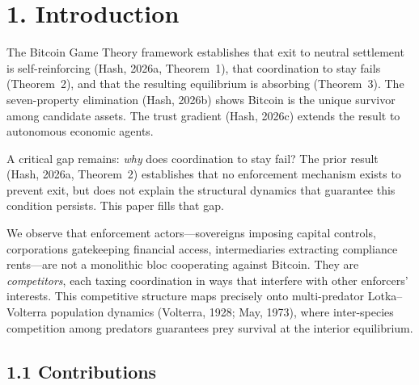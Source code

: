 \documentclass[12pt]{article}
\theoremstyle{definition}
\theoremstyle{remark}
\begin{document}
\newpage

\section{1. Introduction}\label{sec:intro}

The Bitcoin Game Theory framework establishes that exit to neutral
settlement is self-reinforcing (Hash, 2026a, Theorem~1), that
coordination to stay fails (Theorem~2), and that the resulting
equilibrium is absorbing (Theorem~3). The seven-property elimination
(Hash, 2026b) shows Bitcoin is the unique survivor among candidate
assets. The trust gradient (Hash, 2026c) extends the result to
autonomous economic agents.

A critical gap remains: \emph{why} does coordination to stay fail?  The
prior result (Hash, 2026a, Theorem~2) establishes that no enforcement
mechanism exists to prevent exit, but does not explain the structural
dynamics that guarantee this condition persists. This paper fills that
gap.

We observe that enforcement actors---sovereigns imposing capital
controls, corporations gatekeeping financial access, intermediaries
extracting compliance rents---are not a monolithic bloc cooperating
against Bitcoin. They are \emph{competitors}, each taxing coordination
in ways that interfere with other enforcers' interests. This competitive
structure maps precisely onto multi-predator Lotka--Volterra population
dynamics (Volterra, 1928; May, 1973), where inter-species competition
among predators guarantees prey survival at the interior equilibrium.

\subsection{1.1 Contributions}
\end{document}
